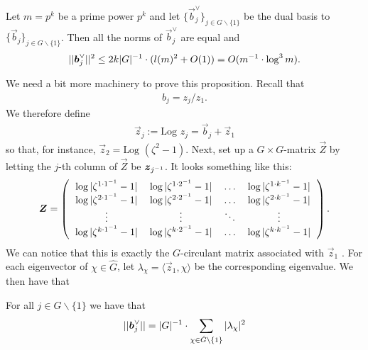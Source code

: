 \begin{proposition}
    Let \(m= p^k\) be a prime power \(p^k\) and let \(\{\vec{b}_j^\vee\}_{j\in G\backslash \{1\}}\) be the dual basis to \(\{\vec{b}_j\}_{j\in G\backslash \{1\}}\). Then all the norms of \(\vec{b}_j^\vee\) are equal and
    \begin{align*}
        ||\boldsymbol{b}_j^\vee||^2 \leq 2k|G|^{-1}\cdot(l(m)^2+O(1)) = O(m^{-1}\cdot\log ^3 m).
    \end{align*}
\end{proposition}
We need a bit more machinery to prove this proposition. Recall that 
\begin{align*}
    b_j = z_j/z_1.
\end{align*}
We therefore define
\begin{align*}
    \vec{z}_j := \text{Log }z_j = \vec{b}_j + \vec{z}_1
\end{align*}
so that, for instance, \(\vec{z}_2 = \text{Log }(\zeta^2 - 1)\). Next, set up a \(G\times G\)-matrix \(\Vec{Z}\) by letting the \(j\)-th column of \(\vec{Z}\) be \(\boldsymbol{z}_{j^{-1}}\). It looks something like this:
\begin{align}
    \vec{Z} = \left(\begin{tabular}{cccc}
           \(\log |\zeta^{1\cdot 1\inverse}-1|\) & \(\log |\zeta^{1\cdot 2^{-1}}-1|\) & \(\dots\) & \(\log |\zeta^{1\cdot k\inverse}-1 |\)\\
           \(\log |\zeta^{2\cdot 1\inverse}-1|\) & \(\log |\zeta^{2\cdot 2^{-1}}-1|\) & \(\dots\) & \(\log |\zeta^{2\cdot k\inverse} -1|\)\\
           \(\vdots\) & \(\vdots\) & \(\ddots\) & \(\vdots\) \\
           \(\log |\zeta^{k\cdot 1\inverse}-1|\) & \(\log |\zeta^{k\cdot 2\inverse}-1|\) & \(\dots\) & \(\log |\zeta^{k\cdot k\inverse}-1|\)
        \end{tabular}\right).
\end{align}
We can notice that this is exactly the \(G\)-circulant matrix associated with \(\vec{z}_1\) . For each eigenvector of \(\chi\in\hat{G}\), let \(\lambda_\chi = \langle \vec{z}_1, \chi\rangle\) be the corresponding eigenvalue. We then have that
\begin{proposition}
    For all \(j\in G\backslash\{ 1 \}\) we have that 
    \begin{align*}
        ||\boldsymbol{b}_j^\vee|| = |G|^{-1}\cdot\sum\limits_{\chi\in \hat{G}\backslash \{ 1 \}}|\lambda_\chi |^2
    \end{align*}
\end{proposition}
